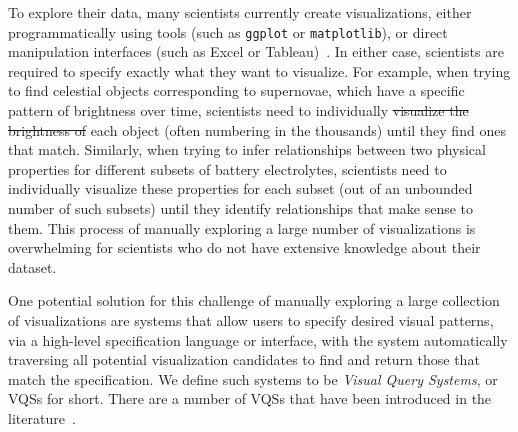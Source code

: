 To explore their data, many scientists currently
create visualizations, either programmatically using 
tools (such as {\tt ggplot} or {\tt matplotlib}),
or direct manipulation interfaces (such as 
Excel or Tableau)~\cite{Momcheva2015,Prabhu2011,Duck2016}. 
In either case, scientists are required to specify exactly what
they want to visualize.  For example, when trying to find celestial objects
corresponding to supernovae, which have a specific pattern
of brightness over time, scientists
need to individually  \sout{visualize the brightness of} 
each object (often numbering in the thousands) until they find ones that match. 
Similarly, when trying to infer relationships between two physical
properties for different subsets of battery electrolytes,
scientists need to individually visualize these properties
for each subset (out of an unbounded number of such subsets)
until they identify relationships that make sense to them. This process of manually exploring a large number of visualizations 
is  overwhelming for scientists who do not have extensive knowledge about their
dataset. 
\par One potential solution for this challenge of manually exploring a large collection of visualizations
are systems that allow users to specify 
desired visual patterns, via a high-level specification language
or interface, with the system automatically
traversing all potential visualization candidates to find
and return those that match the specification. 
We define such systems to be {\em Visual Query Systems}, or VQSs for short.
There are a number of VQSs that have been introduced in the literature~\cite{mohebbi2011google,Hochheiser2004,wattenberg2001sketching,Siddiqui2017VLDB,ryall2005querylines,holz2009relaxed}. 


